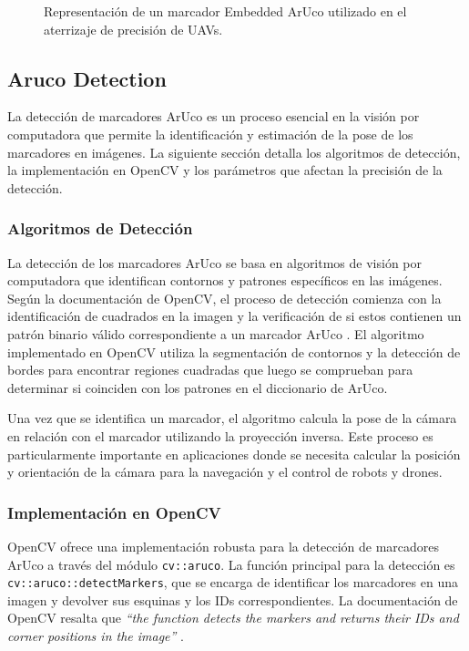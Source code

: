     \begin{figure}[h!] 
        \centering 
        \caption{Representación de un marcador Embedded ArUco utilizado en el aterrizaje de precisión de UAVs.} 
        \label{fig} 
    \end{figure}

\subsection{Aruco Detection}
    La detección de marcadores ArUco es un proceso esencial en la visión por computadora que permite la identificación y estimación de la pose de los marcadores en imágenes. La siguiente sección detalla los algoritmos de detección, la implementación en OpenCV y los parámetros que afectan la precisión de la detección.

    \subsubsection{Algoritmos de Detección}

    La detección de los marcadores ArUco se basa en algoritmos de visión por computadora que identifican contornos y patrones específicos en las imágenes. Según la documentación de OpenCV, el proceso de detección comienza con la identificación de cuadrados en la imagen y la verificación de si estos contienen un patrón binario válido correspondiente a un marcador ArUco \cite{opencv_docs_aruco}. El algoritmo implementado en OpenCV utiliza la segmentación de contornos y la detección de bordes para encontrar regiones cuadradas que luego se comprueban para determinar si coinciden con los patrones en el diccionario de ArUco.

    Una vez que se identifica un marcador, el algoritmo calcula la pose de la cámara en relación con el marcador utilizando la proyección inversa. Este proceso es particularmente importante en aplicaciones donde se necesita calcular la posición y orientación de la cámara para la navegación y el control de robots y drones.

    \subsubsection{Implementación en OpenCV}

    OpenCV ofrece una implementación robusta para la detección de marcadores ArUco a través del módulo \texttt{cv::aruco}. La función principal para la detección es \texttt{cv::aruco::detectMarkers}, que se encarga de identificar los marcadores en una imagen y devolver sus esquinas y los IDs correspondientes. La documentación de OpenCV resalta que \textit{“the function detects the markers and returns their IDs and corner positions in the image”} \cite{opencv_tutorial_aruco}.

